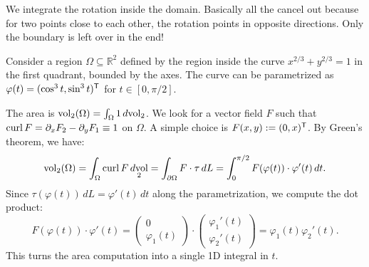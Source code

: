 \begin{ainote}
\begin{center}
\end{center}
We integrate the rotation inside the domain. Basically all the  cancel out because for two points close to each other, the rotation points in opposite directions. Only the boundary is left over in the end!
\end{ainote}

\begin{example}
\label{ex:area_greens_theorem}
Consider a region $\Omega \subseteq \mathbb{R}^2$ defined by the region inside the curve $x^{2/3} + y^{2/3} = 1$ in the first quadrant, bounded by the axes. The curve can be parametrized as $\varphi(t) = (\cos^3 t, \sin^3 t)^{\mathsf{T}}$ for $t \in [0, \pi/2]$.

The area is $\operatorname{vol}_2(\Omega) = \int_\Omega 1 \mathop{d\text{vol}}_2$. We look for a vector field $F$ such that $\operatorname{curl} F = \partial_x F_2 - \partial_y F_1 \equiv 1$ on $\Omega$. A simple choice is $F(x,y) := (0, x)^{\mathsf{T}}$.
By Green's theorem, we have:
\[\operatorname{vol}_2(\Omega) = \int_\Omega \operatorname{curl} F \mathop{d\text{vol}}_2 = \int_{\partial\Omega} F \cdot \tau \,dL = \int_0^{\pi/2} F(\varphi(t)) \cdot \varphi'(t) \,dt.\]
Since $\tau(\varphi(t)) \,dL = \varphi'(t) \,dt$ along the parametrization, we compute the dot product:
\[F(\varphi(t)) \cdot \varphi'(t) = \begin{pmatrix} 0 \\ \varphi_1(t) \end{pmatrix} \cdot \begin{pmatrix} \varphi_1'(t) \\ \varphi_2'(t) \end{pmatrix} = \varphi_1(t)\varphi_2'(t).\]
This turns the area computation into a single 1D integral in $t$.
\end{example}

